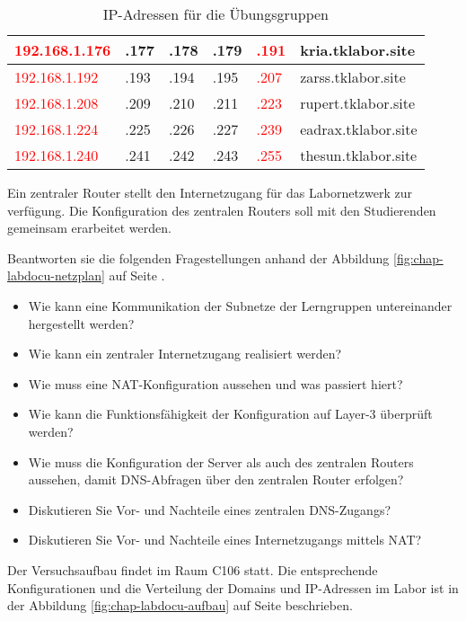 \begin{table}[!h]
\begin{tabular}{l l l l l l}
	\textcolor{red}{192.168.1.176} & .177 & .178 & .179 & \textcolor{red}{.191} &
	kria.tklabor.site \\
	\hline
	\textcolor{red}{192.168.1.192} & .193 & .194 & .195 & \textcolor{red}{.207} &
	zarss.tklabor.site \\
	\textcolor{red}{192.168.1.208} & .209 & .210 & .211 & \textcolor{red}{.223} &
	rupert.tklabor.site \\
	\textcolor{red}{192.168.1.224} & .225 & .226 & .227 & \textcolor{red}{.239} &
	eadrax.tklabor.site \\
	\textcolor{red}{192.168.1.240} & .241 & .242 & .243 & \textcolor{red}{.255} &
	thesun.tklabor.site \\
	\hline
	\end{tabular}
	\caption{IP-Adressen für die Übungsgruppen}
	\label{tab:chap-labdocu-ipadressplan}
\end{table}

Ein zentraler Router stellt den Internetzugang für das Labornetzwerk zur
verfügung. Die Konfiguration des zentralen Routers soll mit den Studierenden
gemeinsam erarbeitet werden.

Beantworten sie die folgenden Fragestellungen anhand der Abbildung
\ref{fig:chap-labdocu-netzplan} auf Seite \pageref{fig:chap-labdocu-netzplan}.

\begin{itemize}
  \item Wie kann eine Kommunikation der Subnetze der Lerngruppen untereinander
  hergestellt werden?
  \item Wie kann ein zentraler Internetzugang realisiert werden? 
  \item Wie muss eine NAT-Konfiguration aussehen und was passiert hiert?
  \item Wie kann die Funktionsfähigkeit der Konfiguration auf Layer-3 überprüft
  werden?
  \item Wie muss die Konfiguration der Server als auch des zentralen Routers
  aussehen, damit DNS-Abfragen über den zentralen Router erfolgen?
  \item Diskutieren Sie Vor- und Nachteile eines zentralen DNS-Zugangs?
  \item Diskutieren Sie Vor- und Nachteile eines Internetzugangs mittels NAT? 
\end{itemize}

Der Versuchsaufbau findet im Raum C106 statt. Die entsprechende
Konfigurationen und die Verteilung der Domains und IP-Adressen im Labor ist
in der Abbildung \ref{fig:chap-labdocu-aufbau} auf Seite
\pageref{fig:chap-labdocu-aufbau} beschrieben.

